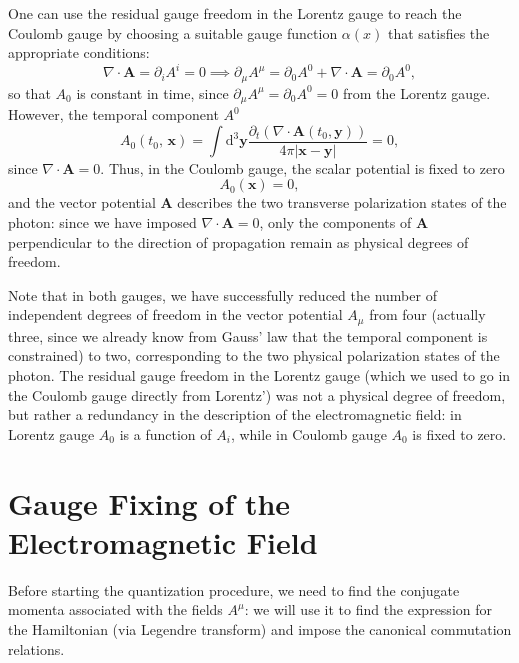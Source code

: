 \begin{enumerate}
          One can use the residual gauge freedom in the Lorentz gauge to reach the Coulomb gauge by choosing a suitable gauge function \(\alpha(x)\) that satisfies the appropriate conditions:
          \[
              \nabla \cdot \mathbf{A} = \partial_i A^i = 0 \implies \partial_\mu A^{\mu} = \partial_0 A^0 + \nabla \cdot \mathbf{A} = \partial_0 A^0,
          \]
          so that \(A_0\) is constant in time, since \(\partial_\mu A^{\mu}=\partial_0 A^0 = 0\) from the Lorentz gauge. However, the temporal component \(A^0\)
          \[
              A_0(t_0,\,\mathbf{x}) = \int \mathrm{d}^3 \mathbf{y} \frac{\partial_t \left(\nabla \cdot \mathbf{A}(t_0, \mathbf{y})\right)}{4\pi \vert \mathbf{x} - \mathbf{y} \vert} = 0,
          \]
          since \(\nabla \cdot \mathbf{A} = 0\). Thus, in the Coulomb gauge, the scalar potential is fixed to zero
          \[
              A_0(\mathbf{x}) = 0,
          \]
          and the vector potential \(\mathbf{A}\) describes the two transverse polarization states of the photon: since we have imposed \(\nabla \cdot \mathbf{A} = 0\), only the components of \(\mathbf{A}\) perpendicular to the direction of propagation remain as physical degrees of freedom.
\end{enumerate}

Note that in both gauges, we have successfully reduced the number of independent degrees of freedom in the vector potential \(A_\mu\) from four (actually three, since we already know from Gauss' law that the temporal component is constrained) to two, corresponding to the two physical polarization states of the photon. The residual gauge freedom in the Lorentz gauge (which we used to go in the Coulomb gauge directly from Lorentz') was not a physical degree of freedom, but rather a redundancy in the description of the electromagnetic field: in Lorentz gauge \(A_0\) is a function of \(A_i\), while in Coulomb gauge \(A_0\) is fixed to zero.

\section{Gauge Fixing of the Electromagnetic Field}\label{sec:gauge_fixing_em_field}

Before starting the quantization procedure, we need to find the conjugate momenta associated with the fields \(A^{\mu}\): we will use it to find the expression for the Hamiltonian (via Legendre transform) and impose the canonical commutation relations.

